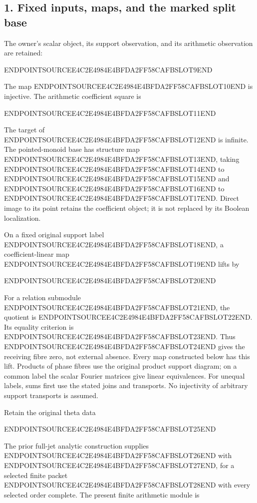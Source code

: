 \subsection{1. Fixed inputs, maps, and the marked split base}\label{endpoint-holonomy_original--fixed-inputs-maps-and-the-marked-split-base}

The owner's scalar object, its support observation, and its arithmetic observation are retained:

ENDPOINTSOURCEE4C2E4984E4BFDA2FF58CAFBSLOT9END

The map ENDPOINTSOURCEE4C2E4984E4BFDA2FF58CAFBSLOT10END is injective. The arithmetic coefficient square is

ENDPOINTSOURCEE4C2E4984E4BFDA2FF58CAFBSLOT11END

The target of ENDPOINTSOURCEE4C2E4984E4BFDA2FF58CAFBSLOT12END is infinite. The pointed-monoid base has structure map ENDPOINTSOURCEE4C2E4984E4BFDA2FF58CAFBSLOT13END, taking ENDPOINTSOURCEE4C2E4984E4BFDA2FF58CAFBSLOT14END to ENDPOINTSOURCEE4C2E4984E4BFDA2FF58CAFBSLOT15END and ENDPOINTSOURCEE4C2E4984E4BFDA2FF58CAFBSLOT16END to ENDPOINTSOURCEE4C2E4984E4BFDA2FF58CAFBSLOT17END. Direct image to its point retains the coefficient object; it is not replaced by its Boolean localization.

On a fixed original support label ENDPOINTSOURCEE4C2E4984E4BFDA2FF58CAFBSLOT18END, a coefficient-linear map ENDPOINTSOURCEE4C2E4984E4BFDA2FF58CAFBSLOT19END lifts by

ENDPOINTSOURCEE4C2E4984E4BFDA2FF58CAFBSLOT20END

For a relation submodule ENDPOINTSOURCEE4C2E4984E4BFDA2FF58CAFBSLOT21END, the quotient is ENDPOINTSOURCEE4C2E4984E4BFDA2FF58CAFBSLOT22END. Its equality criterion is ENDPOINTSOURCEE4C2E4984E4BFDA2FF58CAFBSLOT23END. Thus ENDPOINTSOURCEE4C2E4984E4BFDA2FF58CAFBSLOT24END gives the receiving fibre zero, not external absence. Every map constructed below has this lift. Products of phase fibres use the original product support diagram; on a common label the scalar Fourier matrices give linear equivalences. For unequal labels, sums first use the stated joins and transports. No injectivity of arbitrary support transports is assumed.

Retain the original theta data

ENDPOINTSOURCEE4C2E4984E4BFDA2FF58CAFBSLOT25END

The prior full-jet analytic construction supplies ENDPOINTSOURCEE4C2E4984E4BFDA2FF58CAFBSLOT26END with ENDPOINTSOURCEE4C2E4984E4BFDA2FF58CAFBSLOT27END, for a selected finite packet ENDPOINTSOURCEE4C2E4984E4BFDA2FF58CAFBSLOT28END with every selected order complete. The present finite arithmetic module is

